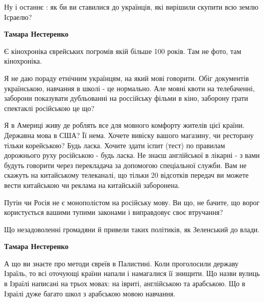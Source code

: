 \begin{itemize}
\begin{itemize}
\begin{itemize}
Ну і останнє : як би ви ставилися до українців, які вирішили скупити всю землю
Ісраелю?


\textbf{Тамара Нестеренко} 

Є кінохроніка єврейських погромів якій більше 100 років. Там не фото, там
кінохроніка.

Я не даю пораду етнічним українцям, на який мові говорити. Обіг документів
українською, навчання в школі - це нормально. Але мовні квоти на телебаченні,
заборони показувати дубльованні на россійську фільми в кіно, заборону грати
спектаклі російською це що?

Я в Америці живу де роблять все для мовного комфорту жителів цієї країни.
Державна мова в США? Її нема. Хочете вивіску вашого магазину, чи ресторану
тільки корейською? Будь ласка. Хочите здати іспит (тест) по правилам дорожнього
руху російською - будь ласка. Не знаєш англійської в лікарні - з вами будуть
говорити через перекладача за допомогою спеціальної служби. Вам не скажуть на
китайському телеканалі, що тільки 20 відсотків передач ви можете вести
китайською чи реклама на китайській заборонена.

Путін чи Росія не є монополістом на російську мову. Ви що, не бачите, що ворог
користується вашими тупими законами і виправдовує своє втручання? 

Що незадоволенні громадяни й привели таких політиків, як Зеленський до влади.

 
\textbf{Тамара Нестеренко} 

А що ви знаєте про методи євреїв в Палистині. Коли проголосили державу Ізраїль,
то всі оточующі країни напали і намагалися її знищити. Що назви вулиць в
Ізраїлі написані на трьох мовах: на івриті, англійською та арабською. Що в
Ізраілі дуже багато школ з арабською мовою навчання.

 

\end{itemize}
\end{itemize}
\end{itemize}
